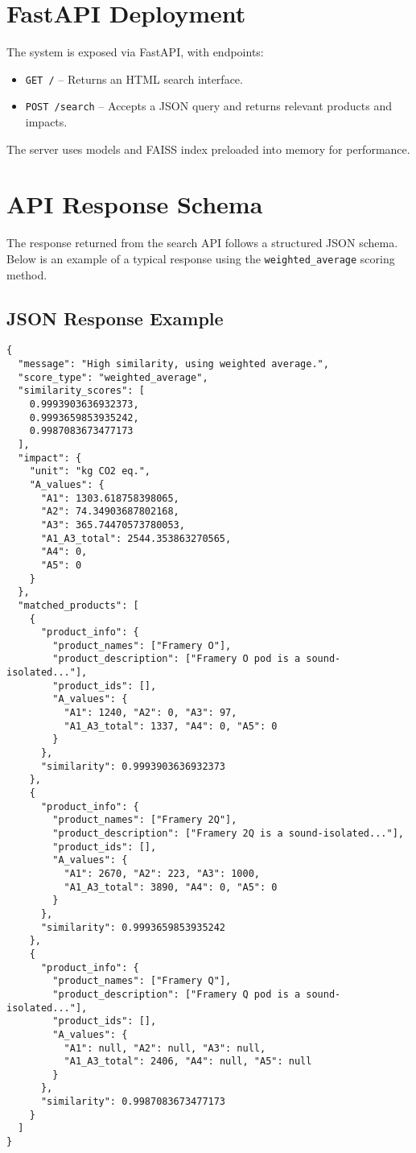 \documentclass[11pt]{article}
\begin{document}
\section{FastAPI Deployment}
The system is exposed via FastAPI, with endpoints:

\begin{itemize}
    \item \texttt{GET /} – Returns an HTML search interface.
    \item \texttt{POST /search} – Accepts a JSON query and returns relevant products and impacts.
\end{itemize}

The server uses models and FAISS index preloaded into memory for performance.

\section{API Response Schema}

The response returned from the search API follows a structured JSON schema. Below is an example of a typical response using the \texttt{weighted\_average} scoring method.

\subsection*{JSON Response Example}

\begin{verbatim}
{
  "message": "High similarity, using weighted average.",
  "score_type": "weighted_average",
  "similarity_scores": [
    0.9993903636932373,
    0.9993659853935242,
    0.9987083673477173
  ],
  "impact": {
    "unit": "kg CO2 eq.",
    "A_values": {
      "A1": 1303.618758398065,
      "A2": 74.34903687802168,
      "A3": 365.74470573780053,
      "A1_A3_total": 2544.353863270565,
      "A4": 0,
      "A5": 0
    }
  },
  "matched_products": [
    {
      "product_info": {
        "product_names": ["Framery O"],
        "product_description": ["Framery O pod is a sound-isolated..."],
        "product_ids": [],
        "A_values": {
          "A1": 1240, "A2": 0, "A3": 97,
          "A1_A3_total": 1337, "A4": 0, "A5": 0
        }
      },
      "similarity": 0.9993903636932373
    },
    {
      "product_info": {
        "product_names": ["Framery 2Q"],
        "product_description": ["Framery 2Q is a sound-isolated..."],
        "product_ids": [],
        "A_values": {
          "A1": 2670, "A2": 223, "A3": 1000,
          "A1_A3_total": 3890, "A4": 0, "A5": 0
        }
      },
      "similarity": 0.9993659853935242
    },
    {
      "product_info": {
        "product_names": ["Framery Q"],
        "product_description": ["Framery Q pod is a sound-isolated..."],
        "product_ids": [],
        "A_values": {
          "A1": null, "A2": null, "A3": null,
          "A1_A3_total": 2406, "A4": null, "A5": null
        }
      },
      "similarity": 0.9987083673477173
    }
  ]
}
\end{verbatim}
\end{document}
